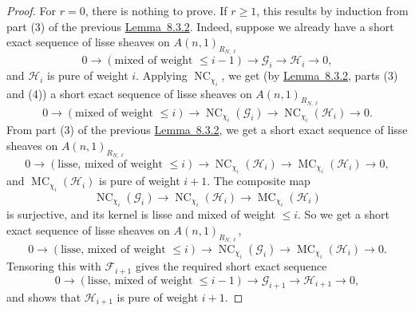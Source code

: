 \begin{proof}
For \(r=0\), there is nothing to prove. If \(r\geq1\), this results by induction from part (3) of the previous \hyperref[lem:8.3.2]{Lemma~8.3.2}. Indeed, suppose we already have a short exact sequence of lisse sheaves on \(A(n,1)_{R_{N,\ell}}\)
\[
0\to(\text{mixed of weight }\leq i-1)\to\mathcal{G}_i\to\mathcal{H}_i\to0,
\]
and \(\mathcal{H}_i\) is pure of weight \(i\). Applying \(\operatorname{NC}_{\chi_i}\), we get (by \hyperref[lem:8.3.2]{Lemma~8.3.2}, parts (3) and (4)) a short exact sequence of lisse sheaves on \(A(n,1)_{R_{N,\ell}}\)
\[
0\to(\text{mixed of weight }\leq i)\to\operatorname{NC}_{\chi_i}(\mathcal{G}_i)\to\operatorname{NC}_{\chi_i}(\mathcal{H}_i)\to0.
\]
From part (3) of the previous \hyperref[lem:8.3.2]{Lemma~8.3.2}, we get a short exact sequence of lisse sheaves on \(A(n,1)_{R_{N,\ell}}\)
\[
0\to(\text{lisse, mixed of weight }\leq i)\to\operatorname{NC}_{\chi_i}(\mathcal{H}_i)\to\operatorname{MC}_{\chi_i}(\mathcal{H}_i)\to0,
\]
and \(\operatorname{MC}_{\chi_i}(\mathcal{H}_i)\) is pure of weight \(i+1\). The composite map
\[
\operatorname{NC}_{\chi_i}(\mathcal{G}_i)\to\operatorname{NC}_{\chi_i}(\mathcal{H}_i)\to\operatorname{MC}_{\chi_i}(\mathcal{H}_i)
\]
is surjective, and its kernel is lisse and mixed of weight \(\leq i\). So we get a short exact sequence of lisse sheaves on \(A(n,1)_{R_{N,\ell}}\),
\[
0\to(\text{lisse, mixed of weight }\leq i)\to\operatorname{NC}_{\chi_i}(\mathcal{G}_i)\to\operatorname{MC}_{\chi_i}(\mathcal{H}_i)\to0.
\]
Tensoring this with \(\mathcal{F}_{i+1}\) gives the required short exact sequence
\[
0\to(\text{lisse, mixed of weight }\leq i-1)\to\mathcal{G}_{i+1}\to\mathcal{H}_{i+1}\to0,
\]
and shows that \(\mathcal{H}_{i+1}\) is pure of weight \(i+1\).
\end{proof}

